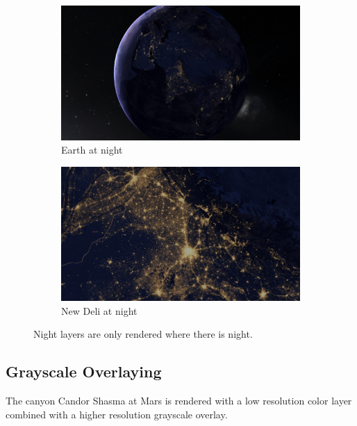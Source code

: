 \begin{figure}[h]
    \centering
    \begin{subfigure}[bt]{0.9\textwidth}
        \includegraphics[width=\textwidth]{figures/results/screenshots/night_earth.png}
        \caption{Earth at night}
    \end{subfigure}
    \begin{subfigure}[bt]{0.9\textwidth}
        \includegraphics[width=\textwidth]{figures/results/screenshots/night_new_deli.png}
        \caption{New Deli at night}
    \end{subfigure}
    \caption{Night layers are only rendered where there is night.}
\end{figure}


\clearpage
\subsection{Grayscale Overlaying}
\FloatBarrier
The canyon Candor Shasma at Mars is rendered with a low resolution color layer combined with a higher resolution grayscale overlay.

